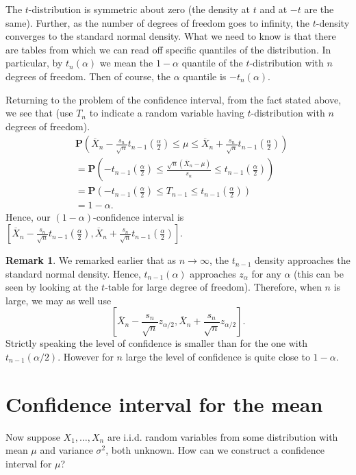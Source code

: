 \documentclass[preprint,  11pt]{amsart}
\theoremstyle{plain} %
\theoremstyle{definition} %
\newtheorem{remark}[theorem]{Remark}
\begin{document}
The $t$-distribution is symmetric about zero (the density at $t$ and at $-t$ are the same). Further, as the number of degrees of freedom goes to infinity, the $t$-density converges to the standard normal density. What we need to know is that there are tables from which we can read off specific quantiles of the distribution. In particular, by $t_{n}(\alpha)$ we mean the $1-\alpha$ quantile of the $t$-distribution with $n$ degrees of freedom. Then of course, the $\alpha$ quantile is $-t_{n}(\alpha)$.

Returning to the problem of the confidence interval, from the fact stated above, we see that (use $T_{n}$ to indicate a random variable having $t$-distribution with $n$ degrees of freedom).
\begin{align*}
& \mathbf{P}\left(\overline{X}_{n}-\frac{s_{n}}{\sqrt{n}}t_{n-1}\left(\frac{\alpha}{2}\right)\le \mu \le\overline{X}_{n}+\frac{s_{n}}{\sqrt{n}}t_{n-1}\left(\frac{\alpha}{2}\right) \right) \\
&=
\mathbf{P}\left(-t_{n-1}\left(\frac{\alpha}{2}\right)\le \frac{\sqrt{n}(\overline{X}_{n}-\mu)}{s_{n}}\le t_{n-1}\left(\frac{\alpha}{2}\right)\right) \\
&= \mathbf{P}\left(-t_{n-1}\left(\frac{\alpha}{2}\right)\le T_{n-1}\le t_{n-1}\left(\frac{\alpha}{2}\right)\right) \\
&= 1-\alpha.
\end{align*}
Hence, our $(1-\alpha)$-confidence interval is $\left[\overline{X}_{n}-\frac{s_{n}}{\sqrt{n}}t_{n-1}\left(\frac{\alpha}{2}\right),\overline{X}_{n}+\frac{s_{n}}{\sqrt{n}}t_{n-1}\left(\frac{\alpha}{2}\right)\right]$.

\begin{remark} We remarked earlier that as $n\rightarrow \infty$, the $t_{n-1}$ density approaches the standard normal density. Hence, $t_{n-1}(\alpha)$ approaches $z_{\alpha}$ for any $\alpha$ (this can be seen by looking at the $t$-table for large degree of freedom). Therefore, when $n$ is large, we may as well use
$$
\left[\overline{X}_{n}-\frac{s_{n}}{\sqrt{n}}z_{\alpha/2},\overline{X}_{n}+\frac{s_{n}}{\sqrt{n}}z_{\alpha/2}\right].
$$
Strictly speaking the level of confidence is smaller than for the one with $t_{n-1}(\alpha/2)$. However for $n$ large the level of confidence is quite close to $1-\alpha$.
\end{remark}
 
 
\section{Confidence interval for the mean}
Now suppose $X_{1},\ldots ,X_{n}$ are i.i.d. random variables from some distribution with mean $\mu$ and variance ${\sigma}^{2}$, both unknown. How can we construct a confidence interval for $\mu$?
\end{document}
